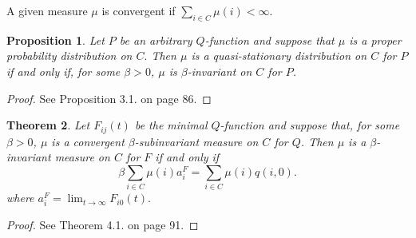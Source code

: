 \documentclass[12pt,a4paper]{scrartcl}
\newtheorem{theorem}{Theorem}[section]
\newtheorem{proposition}[theorem]{Proposition}
\numberwithin{equation}{section}
\begin{document}
A given measure $\mu$ is convergent if $\sum_{i \in C} \mu\left(i\right) < \infty.$

\begin{proposition} \label{quasistationarymuinvariantforp}
Let $P$ be an arbitrary $Q$-function and suppose that $\mu$ is a proper probability distribution on $C.$ Then $\mu$ is a quasi-stationary distribution on $C$ for $P$ if and only if, for some $\beta > 0$, $\mu$ is $\beta$-invariant on $C$ for $P$.
\end{proposition}
\begin{proof}
See \cite{pakes} Proposition 3.1. on page 86.
\end{proof}

\begin{theorem} \label{eq:fromqinvarianttopinvaraint}
Let $F_{ij}\left(t\right)$ be the minimal $Q$-function and suppose that, for some $\beta > 0$, $\mu$ is a convergent $\beta$-subinvariant measure on $C$ for $Q$. Then $\mu$ is a $\beta$-invariant measure on $C$ for $F$ if and only if
\begin{equation} 
\beta \sum_{i \in C} \mu\left(i\right) a_i^F = \sum_{i \in C} \mu\left(i\right) q\left(i,0\right).
\end{equation}
where $a_i^F = \lim_{t \to \infty} F_{i0}\left(t\right).$
\end{theorem}
\begin{proof}
See \cite{pakes} Theorem 4.1. on page 91.
\end{proof}
\end{document}
